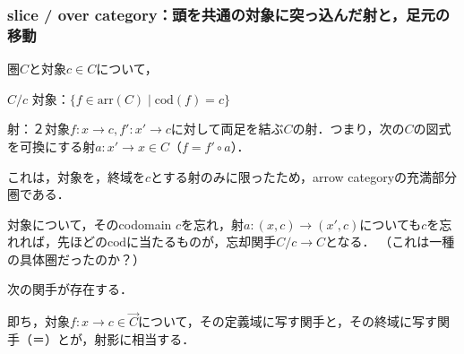 \documentclass[uplatex, 12pt, dvipdfmx]{jsarticle}
\begin{document}
\subsubsection{slice / over category：頭を共通の対象に突っ込んだ射と，足元の移動}

圏$C$と対象$c\in C$について，
\begin{itembox}[l]{$C/c$}
    対象：$\{ f\in\mathrm{arr}(C)\mid \mathrm{cod}(f)=c \}$
    
    射：２対象$f:x\to c, f':x'\to c$に対して両足を結ぶ$C$の射．つまり，次の$C$の図式を可換にする射$a:x'\to x\in C$（$f=f'\circ a$）．
    \begin{center}\end{center}
\end{itembox}
\begin{proposition*}
    これは，対象を，終域を$c$とする射のみに限ったため，arrow categoryの充満部分圏である．
\end{proposition*}

対象について，そのcodomain $c$を忘れ，射$a:(x,c)\to (x',c)$についても$c$を忘れれば，先ほどの$\mathrm{cod}$に当たるものが，忘却関手$C/c\to C$となる．
（これは一種の具体圏だったのか？）
\begin{proposition*}
    次の関手が存在する．
\begin{center}\end{center}
    即ち，対象$f:x\to c\in\overrightarrow{C}$について，その定義域に写す関手と，その終域に写す関手（＝）とが，射影に相当する．
\end{proposition*}
\end{document}
